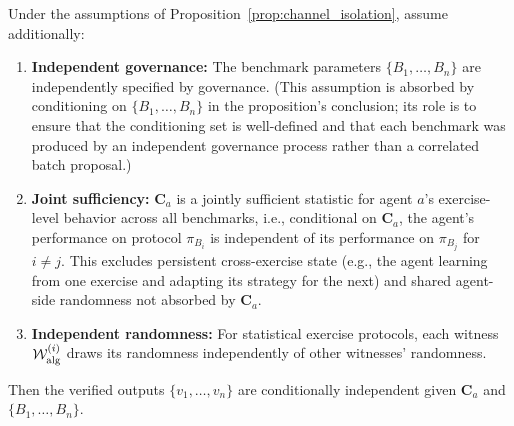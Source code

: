 \begin{proposition}
\label{prop:channel_independence}
Under the assumptions of
Proposition~\ref{prop:channel_isolation}, assume additionally:
\begin{enumerate}
    \item[(ii)] \textbf{Independent governance:} The benchmark
    parameters $\{B_1, \ldots, B_n\}$ are independently specified
    by governance.  (This assumption is absorbed by conditioning on
    $\{B_1, \ldots, B_n\}$ in the proposition's conclusion; its role
    is to ensure that the conditioning set is well-defined and that
    each benchmark was produced by an independent governance process
    rather than a correlated batch proposal.)
    \item[(iii)] \textbf{Joint sufficiency:} $\mathbf{C}_a$ is a
    jointly sufficient statistic for agent $a$'s exercise-level
    behavior across all benchmarks, i.e., conditional on
    $\mathbf{C}_a$, the agent's performance on protocol $\pi_{B_i}$
    is independent of its performance on $\pi_{B_j}$ for $i \neq j$.
    This excludes persistent cross-exercise state (e.g., the agent
    learning from one exercise and adapting its strategy for the next)
    and shared agent-side randomness not absorbed by $\mathbf{C}_a$.
    \item[(iv)] \textbf{Independent randomness:} For statistical
    exercise protocols, each witness $\mathcal{W}^{(i)}_{\mathrm{alg}}$
    draws its randomness independently of other witnesses' randomness.
\end{enumerate}
Then the verified outputs $\{v_1, \ldots, v_n\}$ are conditionally
independent given $\mathbf{C}_a$ and $\{B_1, \ldots, B_n\}$.
\end{proposition}

